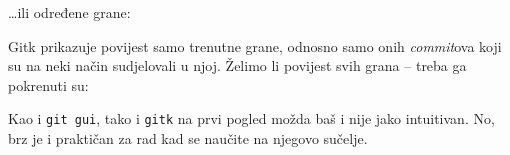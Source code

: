 
\dots{}ili određene grane:


Gitk prikazuje povijest samo trenutne grane, odnosno samo onih \emph{commit}ova koji su na neki način sudjelovali u njoj.
Želimo li povijest svih grana -- treba ga pokrenuti su:


Kao i \verb+git gui+, tako i \verb+gitk+ na prvi pogled možda baš i nije jako intuitivan.
No, brz je i praktičan za rad kad se naučite na njegovo sučelje.

